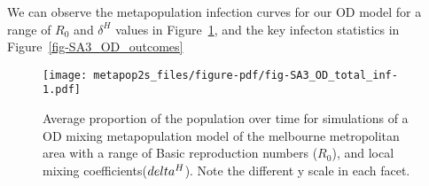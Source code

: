 \documentclass[
  letterpaper,
  DIV=11,
  numbers=noendperiod]{scrartcl}
\begin{document}
We can observe the metapopulation infection curves for our OD model for
a range of \(R_0\) and \(\delta^H\) values in
Figure~\ref{fig-SA3_OD_total_inf}, and the key infecton statistics in
Figure~\ref{fig-SA3_OD_outcomes}

\begin{figure}

{\centering \texttt{[image: metapop2s\_files/figure-pdf/fig-SA3\_OD\_total\_inf-1.pdf]}

}

\caption{\label{fig-SA3_OD_total_inf}Average proportion of the
population over time for simulations of a OD mixing metapopulation model
of the melbourne metropolitan area with a range of Basic reproduction
numbers (\(R_0\)), and local mixing coefficients(\(\\delta^H\)). Note
the different y scale in each facet.}

\end{figure}
\end{document}
